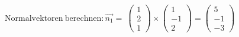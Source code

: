 \documentclass[preview]{standalone}
\begin{document}
\begin{center}
$\mathrm{Normalvektoren \: berechnen: } \vec{n_1} = \:\begin{pmatrix} 1 \\ 2 \\ 1 \end{pmatrix} \times \begin{pmatrix} 1 \\ -1 \\ 2 \end{pmatrix} = \begin{pmatrix} 5 \\ -1 \\ -3 \end{pmatrix}$
\end{center}
\end{document}
